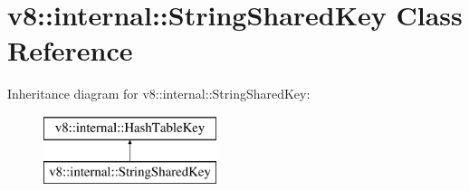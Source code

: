 \hypertarget{classv8_1_1internal_1_1_string_shared_key}{}\section{v8\+:\+:internal\+:\+:String\+Shared\+Key Class Reference}
\label{classv8_1_1internal_1_1_string_shared_key}
Inheritance diagram for v8\+:\+:internal\+:\+:String\+Shared\+Key\+:\begin{figure}[H]
\begin{center}
\leavevmode
\includegraphics[height=2.000000cm]{classv8_1_1internal_1_1_string_shared_key}
\end{center}
\end{figure}
